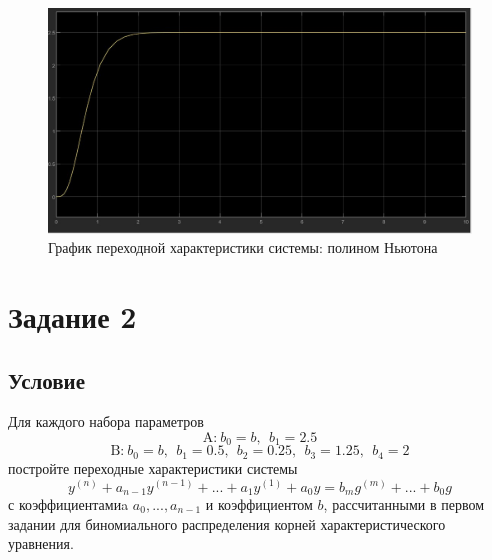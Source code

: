 \documentclass[a4paper, 12pt]{article}
\begin{document}
    \begin{figure}[H]
        \centering
        \includegraphics[scale=0.3]{task_1_newton.jpg}
        \captionsetup{skip=0pt}
        \caption{График переходной характеристики системы: полином Ньютона}
        \label{fig:t1newton}
    \end{figure}


    \section{Задание 2}
    \subsection{Условие}
    Для каждого набора параметров $$\text{A:}\ b_0=b,\ \ b_1=2.5$$
    $$\text{B:}\ b_0=b,\ \ b_1=0.5,\ \ b_2=0.25,\ \ b_3=1.25,\ \ b_4=2$$
    постройте переходные характеристики системы
    $$y^{(n)}+a_{n-1}y^{(n-1)}+...+a_1y^{(1)}+a_0y=b_mg^{(m)}+...+b_0g$$
    с коэффициентамиa $a_0,...,a_{n-1}$ и коэффициентом $b$,
    рассчитанными в первом задании для биномиального распределения
    корней характеристического уравнения.
\end{document}
